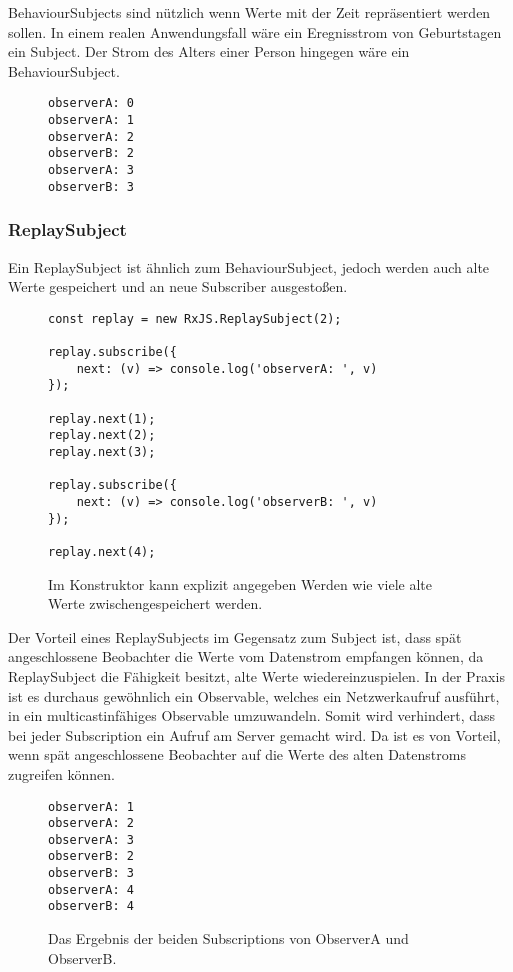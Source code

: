 \noindent
BehaviourSubjects sind nützlich wenn Werte mit der Zeit repräsentiert werden sollen. In einem realen Anwendungsfall wäre ein Eregnisstrom von Geburtstagen ein Subject. Der Strom des Alters einer Person hingegen wäre ein BehaviourSubject.

\begin{figure}[H]
\begin{lstlisting}
observerA: 0
observerA: 1
observerA: 2
observerB: 2
observerA: 3
observerB: 3
\end{lstlisting}
\end{figure}

\subsubsection{ReplaySubject}
Ein ReplaySubject ist ähnlich zum BehaviourSubject, jedoch werden auch alte Werte gespeichert und an neue Subscriber ausgestoßen.

\begin{figure}[H]
\begin{lstlisting}[basicstyle=\small]
const replay = new RxJS.ReplaySubject(2);

replay.subscribe({
    next: (v) => console.log('observerA: ', v)
});

replay.next(1);
replay.next(2);
replay.next(3);

replay.subscribe({
    next: (v) => console.log('observerB: ', v)
});

replay.next(4);
\end{lstlisting}
\caption{Im Konstruktor kann explizit angegeben Werden wie viele alte Werte zwischengespeichert werden.}
\end{figure}

\noindent
Der Vorteil eines ReplaySubjects im Gegensatz zum Subject ist, dass spät angeschlossene Beobachter die Werte vom Datenstrom empfangen können, da ReplaySubject die Fähigkeit besitzt, alte Werte wiedereinzuspielen. In der Praxis ist es durchaus gewöhnlich ein Observable, welches ein Netzwerkaufruf ausführt, in ein multicastinfähiges Observable umzuwandeln. Somit wird verhindert, dass bei jeder Subscription ein Aufruf am Server gemacht wird. Da ist es von Vorteil, wenn spät angeschlossene Beobachter auf die Werte des alten Datenstroms zugreifen können.

\begin{figure}[H]
\begin{lstlisting}
observerA: 1
observerA: 2
observerA: 3
observerB: 2
observerB: 3
observerA: 4
observerB: 4
\end{lstlisting}
\caption{Das Ergebnis der beiden Subscriptions von ObserverA und ObserverB.}
\end{figure}

